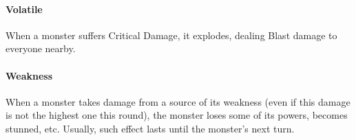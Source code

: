 \documentclass[itdr]{subfiles}
\begin{document}
\vfill
\paragraph{Volatile}
When a monster suffers Critical Damage, it explodes, dealing Blast damage to everyone nearby.

\vfill
\paragraph{Weakness}
When a monster takes damage from a source of its weakness (even if this damage is not the highest one this round), the monster loses some of its powers, becomes stunned, etc. Usually, such effect lasts until the monster's next turn.

\vfill
\end{document}
